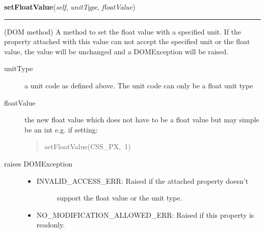     \label{cssutils:css:cssvalue:CSSPrimitiveValue:setFloatValue}

    \vspace{0.5ex}

\hspace{.8\funcindent}\begin{boxedminipage}{\funcwidth}

    \raggedright \textbf{setFloatValue}(\textit{self}, \textit{unitType}, \textit{floatValue})

    \vspace{-1.5ex}

    \rule{\textwidth}{0.5\fboxrule}
\setlength{\parskip}{2ex}

(DOM method) A method to set the float value with a specified unit.
If the property attached with this value can not accept the
specified unit or the float value, the value will be unchanged and
a DOMException will be raised.
\begin{description}
\item[{unitType}] \leavevmode 
a unit code as defined above. The unit code can only be a float
unit type

\item[{floatValue}] \leavevmode 
the new float value which does not have to be a float value but
may simple be an int e.g. if setting:
\begin{quote}{\ttfamily \raggedright \noindent
setFloatValue(CSS{\_}PX,~1)
}\end{quote}

\item[{raises DOMException}] \leavevmode \begin{itemize}
\item {} \begin{description}
\item[{INVALID{\_}ACCESS{\_}ERR: Raised if the attached property doesn't}] \leavevmode 
support the float value or the unit type.

\end{description}

\item {} 
NO{\_}MODIFICATION{\_}ALLOWED{\_}ERR: Raised if this property is readonly.

\end{itemize}

\end{description}
\setlength{\parskip}{1ex}
    \end{boxedminipage}

